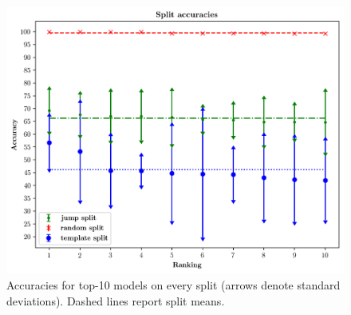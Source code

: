 
\begin{figure}[h]
    \includegraphics[width=.5\textwidth,keepaspectratio]{figures/accuracies_all_splits.png}
    \centering
    \caption{Accuracies for top-10 models on every split (arrows
      denote standard deviations). Dashed lines report split
      means. }
    \label{fig:exp1}
\end{figure}



